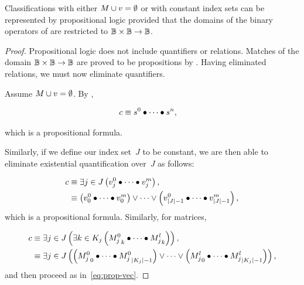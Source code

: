 \begin{theorem}
  Classifications with either $M\cup v=\emptyset$ or with constant index
    sets can be represented by propositional logic provided that the domains
    of the binary operators of  are restricted to
    $\mathbb{B}\times\mathbb{B}\rightarrow\mathbb{B}$.
\end{theorem}
\begin{proof}
  Propositional logic does not include quantifiers or relations.
  Matches of the domain $\mathbb{B}\times\mathbb{B}\rightarrow\mathbb{B}$ are proved to be propositions by
    .
  Having eliminated relations,
    we must now eliminate quantifiers.

  Assume $M\cup v=\emptyset$.
  By ,

  \begin{align*}
    c &\equiv s^0\bullet\cdots\bullet s^n,
  \end{align*}

  \noindent
  which is a propositional formula.

  Similarly,
    if we define our index set~$J$ to be constant,
      we are then able to eliminate existential quantification over~$J$
      as follows:

  \begin{equation}\label{eq:prop-vec}
  \begin{aligned}
    c &\equiv \Exists{j\in J}{\cpredvecseq}, \\
      &\equiv \left(v^0_0\bullet\cdots\bullet v^m_0\right)
              \lor\cdots\lor
              \left(v^0_{|J|-1}\bullet\cdots\bullet v^m_{|J|-1}\right),
  \end{aligned}
  \end{equation}
  which is a propositional formula.
  Similarly,
    for matrices,

  \begin{align*}
    c &\equiv \Exists{j\in J}{\Exists{k\in K_j}{\cpredmatseq}}, \nonumber\\
      &\equiv \Exists{j\in J}{
                \left({M^0_j}_0\bullet\cdots\bullet{M^0_j}_{|K_j|-1}\right)
                \lor\cdots\lor
                \left({M^l_j}_0\bullet\cdots\bullet{M^l_j}_{|K_j|-1}\right)
              },
  \end{align*}
  and then proceed as in~\ref{eq:prop-vec}.
\end{proof}
